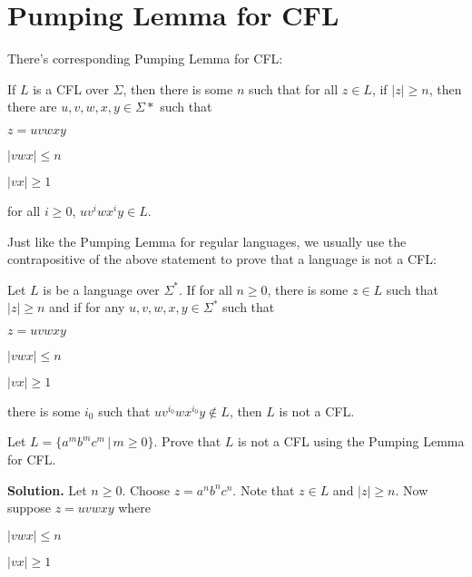\section{Pumping Lemma for CFL}

There's corresponding Pumping Lemma for CFL:

\begin{lem}
If $L$ is a CFL over $\Sigma$, then there is some $n$ such that for
all $z \in L$, if $|z|\geq n$, then there are $u,v,w,x,y \in
\Sigma*$ such that
\begin{tightlist}
 \item $z = uvwxy$
 \item $|vwx| \leq n$
 \item $|vx| \geq 1$
 \item for all $i \geq 0$, $uv^iwx^iy \in L$.
\end{tightlist}
\end{lem}

Just like the Pumping Lemma for regular languages, we usually use
the contrapositive of the above statement to prove that a language
is not a CFL:

\begin{lem}
Let $L$ is be a language over $\Sigma^*$. If for all $n \geq 0$,
there is some $z \in L$ such that $|z| \geq n$ and if for any
$u,v,w,x,y \in \Sigma^*$ such that
\begin{tightlist}
 \item $z = uvwxy$
 \item $|vwx| \leq n$
 \item $|vx| \geq 1$
 \item there is some $i_0$ such that $uv^{i_0} w x^{i_0} y \notin
 L$,
then $L$ is not a CFL.
\end{tightlist}
\end{lem}



\newpage
\begin{eg}
Let $L = \{a^mb^mc^m \,|\, m \geq 0\}$. Prove that $L$ is not a CFL
using the Pumping Lemma for CFL.
\end{eg}

\textbf{Solution.} Let $n \geq 0$. Choose $z = a^nb^nc^n$. Note that $z
\in L$ and $|z| \geq n$. Now suppose $z = uvwxy$ where
\begin{tightlist}
\item $|vwx|\leq n$
\item $|vx| \geq 1$
\end{tightlist}


